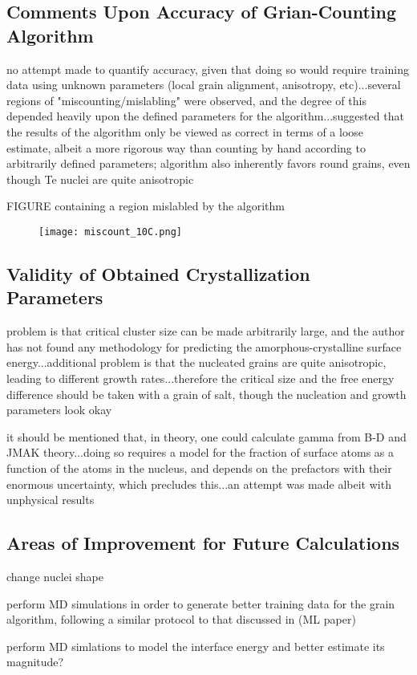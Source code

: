 \subsection{Comments Upon Accuracy of Grian-Counting Algorithm}

no attempt made to quantify accuracy, given that doing so would require training data using unknown parameters (local grain alignment, anisotropy, etc)...several regions of "miscounting/mislabling" were observed, and the degree of this depended heavily upon the defined parameters for the algorithm...suggested that the results of the algorithm only be viewed as correct in terms of a loose estimate, albeit a more rigorous way than counting by hand according to arbitrarily defined parameters; algorithm also inherently favors round grains, even though Te nuclei are quite anisotropic

FIGURE containing a region mislabled by the algorithm

	\begin{figure}[h]
		\centering
		\texttt{[image: miscount\_10C.png]}
		\caption{}
		\label{fig:miscount}
	\end{figure}

\subsection{Validity of Obtained Crystallization Parameters}

problem is that critical cluster size can be made arbitrarily large, and the author has not found any methodology for predicting the amorphous-crystalline surface energy...additional problem is that the nucleated grains are quite anisotropic, leading to different growth rates...therefore the critical size and the free energy difference should be taken with a grain of salt, though the nucleation and growth parameters look okay

it should be mentioned that, in theory, one could calculate gamma from B-D and JMAK theory...doing so requires a model for the fraction of surface atoms as a function of the atoms in the nucleus, and depends on the prefactors with their enormous uncertainty, which precludes this...an attempt was made albeit with unphysical results

\subsection{Areas of Improvement for Future Calculations}

change nuclei shape

perform MD simulations in order to generate better training data for the grain algorithm, following a similar protocol to that discussed in (ML paper)

perform MD simlations to model the interface energy and better estimate its magnitude?
